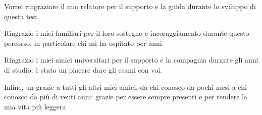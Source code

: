 \documentclass[12pt,a4paper,openright,twoside]{book}
\begin{document}

\backmatter

\nocite{*} %





\begin{acknowledgements} %
Vorrei ringraziare il mio relatore per il supporto e la guida durante lo sviluppo di questa tesi.

Ringrazio i miei familiari per il loro sostegno e incoraggiamento durante questo percorso, in particolare chi mi ha ospitato per anni.

Ringrazio i miei amici universitari per il supporto e la compagnia durante gli anni di studio: è stato un piacere dare gli esami con voi.

Infine, un grazie a tutti gli altri miei amici, da chi conosco da pochi mesi a chi conosco da più di venti anni: grazie per essere sempre presenti e per rendere la mia vita più leggera.\end{acknowledgements}
\end{document}
